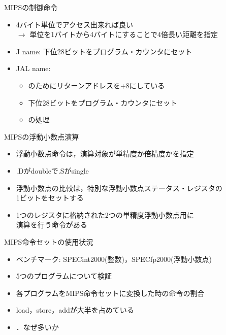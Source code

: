 \documentclass[dvipdfmx]{beamer}
\begin{document}
	\begin{frame}{MIPSの制御命令}
		\begin{itemize}
			\item 4バイト単位でアクセス出来れば良い\\ $\to$ 単位を1バイトから4バイトにすることで4倍長い距離を指定
			\item J name: 下位28ビットをプログラム・カウンタにセット
			\item JAL name: 
				\begin{itemize}
					\item  {}のためにリターンアドレスを+8にしている
					\item 下位28ビットをプログラム・カウンタにセット
					\item {}の処理
				\end{itemize}
		\end{itemize}
	\end{frame}

	\begin{frame}{MIPSの浮動小数点演算}
		\begin{itemize}
			\item 浮動小数点命令は，演算対象が単精度か倍精度かを指定
			\item .Dがdoubleで.Sがsingle
			\item 浮動小数点の比較は，特別な浮動小数点ステータス・レジスタの\\1ビットをセットする
			\item 1つのレジスタに格納された2つの単精度浮動小数点用に\\演算を行う命令がある
		\end{itemize}
	\end{frame}

	\begin{frame}{MIPS命令セットの使用状況}
		\begin{itemize}
			\item ベンチマーク: SPECint2000(整数)，SPECfp2000(浮動小数点)
			\item 5つのプログラムについて検証
			\item 各プログラムをMIPS命令セットに変換した時の命令の割合
			\item load，store，addが大半を占めている
			\item {}．なぜ多いか
		\end{itemize}
	\end{frame}
\end{document}
